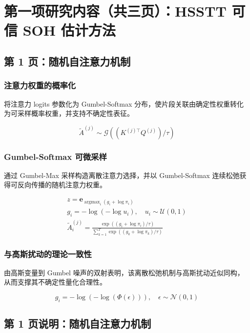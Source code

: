 ﻿\documentclass[UTF8,a4paper,10pt]{ctexart}
\begin{document}
\section{第一项研究内容（共三页）：HSSTT 可信 SOH 估计方法}

\subsection{第 1 页：随机自注意力机制}

\subsubsection*{注意力权重的概率化}
将注意力 logits 参数化为 Gumbel-Softmax 分布，使片段关联由确定性权重转化为可采样概率权重，并支持不确定性表征。
\begin{formulabox}
\[
  \tilde{A}^{(j)} \sim \mathcal{G}\left((K^{(j)\top}Q^{(j)})/\tau\right)
\]
\end{formulabox}

\subsubsection*{Gumbel-Softmax 可微采样}
通过 Gumbel-Max 采样构造离散注意力选择，并以 Gumbel-Softmax 连续松弛获得可反向传播的随机注意力权重。
\begin{formulabox}
\[\begin{gathered}
  z = \bm e_{\operatorname{argmax}_i(g_i+\log \pi_i)} \\
  g_i = -\log(-\log u_i), \quad u_i\sim \mathcal{U}(0,1) \\
  \tilde{A}^{(j)}_i
  =\frac{\exp((g_i+\log \pi_i)/\tau)}
  {\sum_{k=1}^{T}\exp((g_k+\log \pi_k)/\tau)} 
\end{gathered}\]
\end{formulabox}

\subsubsection*{与高斯扰动的理论一致性}
由高斯变量到 Gumbel 噪声的双射表明，该离散松弛机制与高斯扰动近似同构，从而支撑其不确定性量化合理性。
\begin{formulabox}
\[
  g_i = -\log(-\log(\Phi(\epsilon))), \quad \epsilon\sim\mathcal{N}(0,1)
\]
\end{formulabox}

\clearpage
\subsection*{第 1 页说明：随机自注意力机制}
\end{document}
